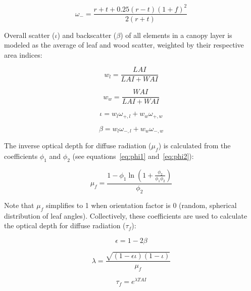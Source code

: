 \begin{equation}\label{eq:backscatter_leaf}
   \omega_- = \frac{r + t + 0.25 (r - t) {(1 + f)} ^ 2}{2 (r + t)} 
\end{equation}


Overall scatter ($\iota$) and backscatter ($\beta$) of all elements in a canopy layer is modeled as the average of leaf and wood scatter, weighted by their respective area indices:

\begin{equation}\label{eq:wl}
  w_l = \frac{LAI}{LAI + WAI}
\end{equation}

\begin{equation}\label{eq:ww}
  w_w = \frac{WAI}{LAI + WAI}
\end{equation}

\begin{equation}\label{eq:scatter}
  \iota = w_l \omega_{+,l} + w_w \omega_{+,w}
\end{equation}

\begin{equation}\label{eq:backscatter}
  \beta = w_l \omega_{-,l} + w_w \omega_{-,w}
\end{equation}

The inverse optical depth for diffuse radiation ($\mu_f$) is calculated from the coefficients $\phi_1$ and $\phi_2$ (see equations~\ref{eq:phi1} and~\ref{eq:phi2}):

\begin{equation}
   \mu_f = \frac{1 - \phi_1 \ln{(1 + \frac{\phi_2}{\phi_1 \phi_2})}}{\phi_2} 
\end{equation}

Note that $\mu_f$ simplifies to 1 when orientation factor is 0 (random, spherical distribution of leaf angles).
Collectively, these coefficients are used to calculate the optical depth for diffuse radiation ($\tau_f$):

\begin{equation}
  \epsilon = 1 - 2\beta
\end{equation}

\begin{equation}
  \lambda = \frac{\sqrt{(1 - \epsilon\iota) (1 - \iota)}}{\mu_f}
\end{equation}

\begin{equation}
  \tau_f = e ^ {\lambda TAI}
\end{equation}

